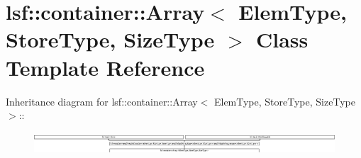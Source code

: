 \hypertarget{classlsf_1_1container_1_1Array}{
\section{lsf::container::Array$<$ ElemType, StoreType, SizeType $>$ Class Template Reference}
\label{classlsf_1_1container_1_1Array}
}
Inheritance diagram for lsf::container::Array$<$ ElemType, StoreType, SizeType $>$::\begin{figure}[H]
\begin{center}
\leavevmode
\includegraphics[height=0.845921cm]{classlsf_1_1container_1_1Array}
\end{center}
\end{figure}
